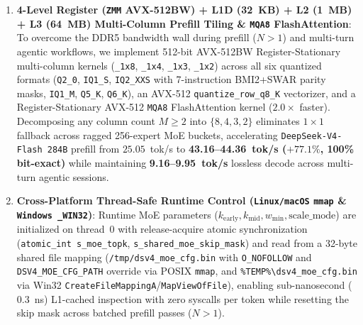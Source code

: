 \documentclass[10pt,twocolumn]{article}
\begin{document}
\begin{enumerate}
    \item \textbf{4-Level Register (\texttt{ZMM} AVX-512BW) + L1D (32~KB) + L2 (1~MB) + L3 (64~MB) Multi-Column Prefill Tiling \& \texttt{MQA8} FlashAttention}: To overcome the DDR5 bandwidth wall during prefill ($N>1$) and multi-turn agentic workflows, we implement 512-bit AVX-512BW Register-Stationary multi-column kernels (\texttt{\_1x8}, \texttt{\_1x4}, \texttt{\_1x3}, \texttt{\_1x2}) across all six quantized formats (\texttt{Q2\_0}, \texttt{IQ1\_S}, \texttt{IQ2\_XXS} with 7-instruction BMI2+SWAR parity masks, \texttt{IQ1\_M}, \texttt{Q5\_K}, \texttt{Q6\_K}), an AVX-512 \texttt{quantize\_row\_q8\_K} vectorizer, and a Register-Stationary AVX-512 \texttt{MQA8} FlashAttention kernel ($2.0\times$ faster). Decomposing any column count $M \ge 2$ into $\{8, 4, 3, 2\}$ eliminates $1\times 1$ fallback across ragged 256-expert MoE buckets, accelerating \texttt{DeepSeek-V4-Flash 284B} prefill from $25.05$~tok/s to \textbf{43.16--44.36~tok/s ($+77.1\%$, 100\% bit-exact)} while maintaining \textbf{9.16--9.95~tok/s} lossless decode across multi-turn agentic sessions.
    \item \textbf{Cross-Platform Thread-Safe Runtime Control (\texttt{Linux/macOS} \texttt{mmap} \& \texttt{Windows \_WIN32})}: Runtime MoE parameters ($k_{\text{early}}, k_{\text{mid}}, w_{\min}, \text{scale\_mode}$) are initialized on thread~0 with release-acquire atomic synchronization (\texttt{atomic\_int s\_moe\_topk}, \texttt{s\_shared\_moe\_skip\_mask}) and read from a 32-byte shared file mapping (\texttt{/tmp/dsv4\_moe\_cfg.bin} with \texttt{O\_NOFOLLOW} and \texttt{DSV4\_MOE\_CFG\_PATH} override via POSIX \texttt{mmap}, and \texttt{\%TEMP\%\textbackslash dsv4\_moe\_cfg.bin} via Win32 \texttt{CreateFileMappingA}/\texttt{MapViewOfFile}), enabling sub-nanosecond ($0.3$~ns) L1-cached inspection with zero syscalls per token while resetting the skip mask across batched prefill passes ($N > 1$).
\end{enumerate}
\end{document}
